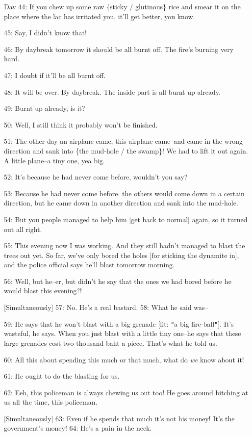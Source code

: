 Dav 44: If you chew up some raw \{sticky / glutinous\} rice and smear it on the
place where the lac has irritated you, it'll get better, you know.

45: Say, I didn't know that!

46: By daybreak tomorrow it should be all burnt off. The fire's burning very hard.

47: I doubt if it'll be all burnt off.

48: It will be over. By daybreak. The inside part is all burnt up already.

49: Burnt up already, is it?

50: Well, I still think it probably won't be finished.

51: The other day an airplane came, this airplane came--and came in the wrong direction
and sank into \{the mud-hole / the swamp\}!  We had to lift it out again. A little
plane--a tiny one, yea big.

52: It's because he had never come before, wouldn't you say?

53: Because he had never come before. the others would come down in a certain direction,
but he came down in another direction and sank into the mud-hole.

54: But you people managed to help him [get back to normal] again, so it turned
out all right.

55: This evening now I was working. And they still hadn't managed to blast the
trees out yet. So far, we've only bored the holes [for sticking the dynamite in],
and the police official says he'll blast tomorrow morning.

56: Well, but he--er, but didn't he say that the ones we had bored before he would
blast this evening?!

[Simultaneously] 57: No. He's a real bastard. 58: What he said was--

59: He says that he won't blast with a big grenade [lit: \texttt{"}a big fire-ball\texttt{"}].
It's wasteful, he says. When you just blast with a little tiny one--he says that
these large grenades cost two thousand baht a piece. That's what he told us.

60: All this about spending this much or that much, what do \textit{we} know about
it!

61: He ought to do the blasting for us.

62: Eeh, this policeman is always chewing us out too! He goes around bitching at
us all the time, this policeman.

[Simultaneously] 63: Even if he spends that much it's not his money! It's the government's
money! 64: He's a pain in the neck.

